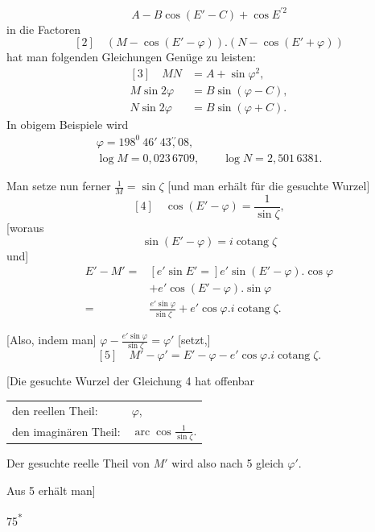 \[
A-B\cos(E'-C)+\cos E^{\prime2}
\]
in die Factoren
\[
[2]\quad(M-\cos(E'-\varphi))\mathord{.}(N-\cos(E'+\varphi))
\]
hat man folgenden Gleichungen Genüge zu leisten:
\[
\begin{aligned}
{[3]}\quad MN&=A+\sin\varphi^2,\\
M\sin2\varphi&=B\sin(\varphi-C),\\
N\sin2\varphi&=B\sin(\varphi+C).
\end{aligned}
\]
In obigem Beispiele wird
\[
\begin{gathered}
\varphi=198^0\ 46'\ 43\overset{\prime\prime}{,}08,\\
\log M=0{,}023\,6709,\qquad
\log N=2{,}501\,6381.
\end{gathered}
\]
\par\noindent\hspace*{\parindent}Man setze nun ferner \(\frac1M=\sin\zeta\) [und man erhält für die gesuchte Wurzel]
\[
[4]\quad\cos(E'-\varphi)=\frac1{\sin\zeta},
\]
[woraus
\[
\sin(E'-\varphi)=i\operatorname{cotang}\zeta
\]
und]
\[
\begin{aligned}
E'-M'={}&[e'\sin E'=]e'\sin(E'-\varphi)\mathord{.}\cos\varphi\\
&+e'\cos(E'-\varphi)\mathord{.}\sin\varphi\\
={}&\frac{e'\sin\varphi}{\sin\zeta}
  +e'\cos\varphi\mathord{.}i\operatorname{cotang}\zeta.
\end{aligned}
\]
\par\noindent\hspace*{\parindent}[Also, indem man] \(\varphi-\frac{e'\sin\varphi}{\sin\zeta}=\varphi'\) [setzt,]
\[
[5]\quad M'-\varphi'=E'-\varphi-e'\cos\varphi\mathord{.}i\operatorname{cotang}\zeta.
\]
\par\noindent\hspace*{\parindent}[Die gesuchte Wurzel der Gleichung 4 hat offenbar
\begin{center}
\begin{tabular}{@{}ll@{}}
den reellen Theil: & \(\varphi\),\\
den imaginären Theil: & \(\operatorname{arc}\cos\frac1{\sin\zeta}\).\\
\end{tabular}
\end{center}
Der gesuchte reelle Theil von \(M'\) wird also nach 5 gleich \(\varphi'\).
\par\noindent\hspace*{\parindent}Aus 5 erhält man]
\par\noindent\hfill75\textsuperscript{*}\par
